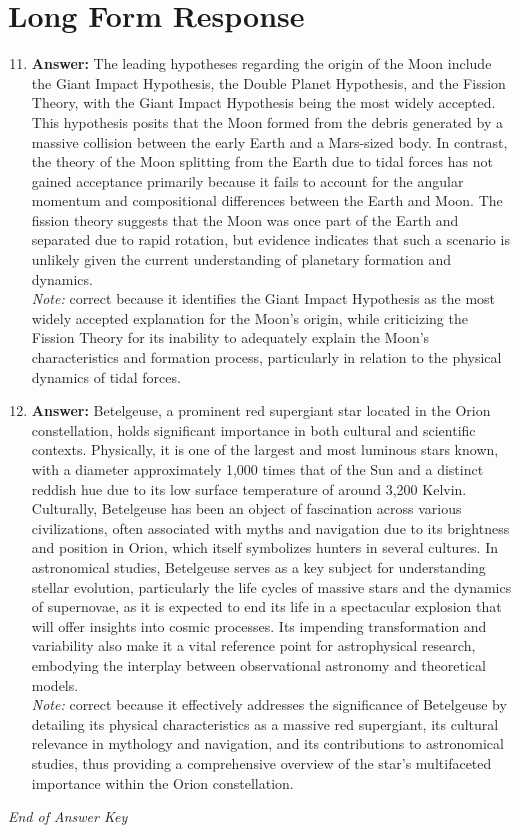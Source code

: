 \documentclass[12pt]{article}
\begin{document}
\section*{Long Form Response}
\begin{enumerate}[label=\arabic*.]
\setcounter{enumi}{10}
\item \textbf{Answer:} The leading hypotheses regarding the origin of the Moon include the Giant Impact Hypothesis, the Double Planet Hypothesis, and the Fission Theory, with the Giant Impact Hypothesis being the most widely accepted. This hypothesis posits that the Moon formed from the debris generated by a massive collision between the early Earth and a Mars-sized body. In contrast, the theory of the Moon splitting from the Earth due to tidal forces has not gained acceptance primarily because it fails to account for the angular momentum and compositional differences between the Earth and Moon. The fission theory suggests that the Moon was once part of the Earth and separated due to rapid rotation, but evidence indicates that such a scenario is unlikely given the current understanding of planetary formation and dynamics.
\\ \textit{Note:} correct because it identifies the Giant Impact Hypothesis as the most widely accepted explanation for the Moon's origin, while criticizing the Fission Theory for its inability to adequately explain the Moon's characteristics and formation process, particularly in relation to the physical dynamics of tidal forces.
\item \textbf{Answer:} Betelgeuse, a prominent red supergiant star located in the Orion constellation, holds significant importance in both cultural and scientific contexts. Physically, it is one of the largest and most luminous stars known, with a diameter approximately 1,000 times that of the Sun and a distinct reddish hue due to its low surface temperature of around 3,200 Kelvin. Culturally, Betelgeuse has been an object of fascination across various civilizations, often associated with myths and navigation due to its brightness and position in Orion, which itself symbolizes hunters in several cultures. In astronomical studies, Betelgeuse serves as a key subject for understanding stellar evolution, particularly the life cycles of massive stars and the dynamics of supernovae, as it is expected to end its life in a spectacular explosion that will offer insights into cosmic processes. Its impending transformation and variability also make it a vital reference point for astrophysical research, embodying the interplay between observational astronomy and theoretical models.
\\ \textit{Note:} correct because it effectively addresses the significance of Betelgeuse by detailing its physical characteristics as a massive red supergiant, its cultural relevance in mythology and navigation, and its contributions to astronomical studies, thus providing a comprehensive overview of the star's multifaceted importance within the Orion constellation.
\end{enumerate}

\vfill
\noindent\textit{End of Answer Key}
\end{document}

